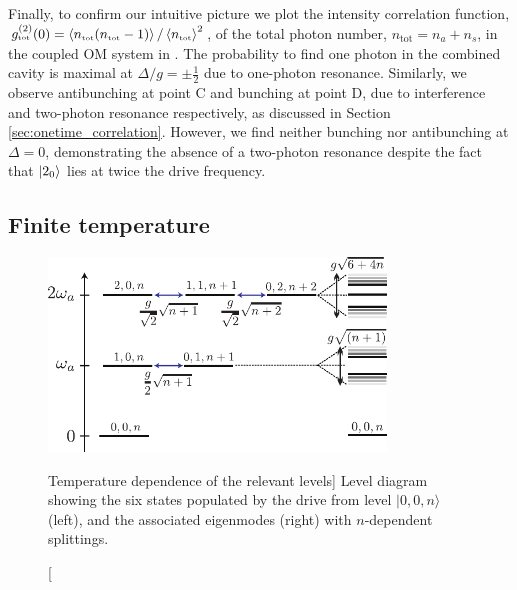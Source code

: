 Finally, to confirm our intuitive picture we plot the
intensity correlation function, 
$g^{(2)}_{\mbox{\tiny tot}}(0) =
\left< n_{\mbox{\tiny tot}}(n_{\mbox{\tiny tot}}-1) \right>/\left< n_{\mbox{\tiny tot}} \right>^2$,
of the total photon number, $n_{\text{tot}} = n_a +
n_s$,
in the coupled OM system in
. 
The probability to find one photon in the combined
cavity is maximal at $\Delta/g=\pm \frac{1}{2}$ 
due to one-photon resonance.
Similarly, we  
observe antibunching at point C
and bunching at point D,
due  to interference and two-photon resonance
respectively,
as discussed 
in Section \ref{sec:onetime_correlation}.
However, we find neither bunching nor antibunching
at $\Delta = 0$, 
demonstrating the absence of a two-photon resonance
despite the fact that $| 2_0 \rangle$ lies at twice the
drive frequency.




 


\subsection{Finite temperature}

\begin{figure}
\centering
  \includegraphics[width=0.8\textwidth]{./figs_Komar2013/fig4a.pdf}
  \caption
  [Temperature dependence of the relevant levels]
  {
  \label{fig:thermal_g2_a}
  Level diagram showing the
  six states populated by the drive from level $|0,0,n\rangle$ (left), 
  and the associated
  eigenmodes (right) with $n$-dependent splittings.
}
\end{figure} 

